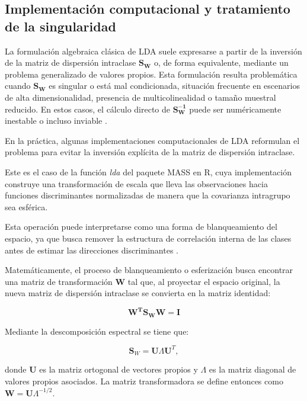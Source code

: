 \subsection{Implementación computacional y tratamiento de la singularidad}

La formulación algebraica clásica de LDA suele expresarse a partir de la inversión de la matriz de dispersión intraclase $\mathbf{S_W}$ o, de forma equivalente, mediante un problema generalizado de valores propios. Esta formulación resulta problemática cuando $\mathbf{S_W}$ es singular o está mal condicionada, situación frecuente en escenarios de alta dimensionalidad, presencia de multicolinealidad o tamaño muestral reducido. En estos casos, el cálculo directo de $\mathbf{S_W^{-1}}$ puede ser numéricamente inestable o incluso inviable \cite{friedman1989regularized}.

En la práctica, algunas implementaciones computacionales de LDA reformulan el problema para evitar la inversión explícita de la matriz de dispersión intraclase. 

Este es el caso de la función \textit{lda} del paquete MASS en R, cuya implementación construye una transformación de escala que lleva las observaciones hacia funciones discriminantes normalizadas de manera que la covarianza intragrupo sea esférica.

Esta operación puede interpretarse como una forma de blanqueamiento del espacio, ya que busca remover la estructura de correlación interna de las clases antes de estimar las direcciones discriminantes \cite{venables2002modern}.

Matemáticamente, el proceso de blanqueamiento o esferización busca encontrar una matriz de transformación $\mathbf{W}$ tal que, al proyectar el espacio original, la nueva matriz de dispersión intraclase se convierta en la matriz identidad:

\begin{equation}
	\mathbf{W^TS_WW = I}
	\label{eq:EMT9}
\end{equation}

Mediante la descomposición espectral se tiene que: 

\begin{equation}
	\mathbf{S}_W = \mathbf{U} \Lambda \mathbf{U}^T,
	\label{eq:EMT10}
\end{equation}

\noindent donde $\mathbf{U}$ es la matriz ortogonal de vectores propios y $\Lambda$ es la matriz diagonal de valores propios asociados. La matriz transformadora se define entonces como $\mathbf{W} = \mathbf{U} \Lambda^{-1/2}$.

